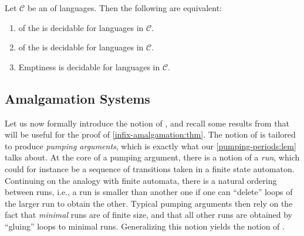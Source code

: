 \begin{theorem}
	\label{infix-wqo-is-emptiness:thm}
	Let $\mathcal{C}$ be an  of languages.
    Then the following are equivalent:
	\begin{enumerate}
        \item\label{wqo-infix-decidable}  of the  is decidable for languages in $\mathcal{C}$.
        \item\label{wqo-prefix-decidable}  of the  is decidable for languages in $\mathcal{C}$.
        \item\label{emptiness-decidable} Emptiness is decidable for languages in $\mathcal{C}$.
	\end{enumerate}
\end{theorem}


\subsection{Amalgamation Systems}
\label{amalgamation-systems:subsec}

Let us now formally introduce the notion of , and
recall some results from \cite{ASZZ24} that will be useful for the proof of
\cref{infix-amalgamation:thm}. The notion of  is
tailored to produce \emph{pumping arguments}, which is exactly what our
\cref{pumping-periods:lem} talks about. At the core of a pumping argument,
there is a notion of a \emph{run}, which could for instance be a sequence of
transitions taken in a finite state automaton. Continuing on the analogy with
finite automata, there is a natural ordering between runs, i.e., a run is
smaller than another one if one can ``delete'' loops of the larger run to obtain
the other. Typical pumping arguments then rely on the fact that
\emph{minimal} runs are of finite size, and that all other runs are
obtained by ``gluing'' loops to minimal runs. Generalizing this notion yields the 
notion of .

